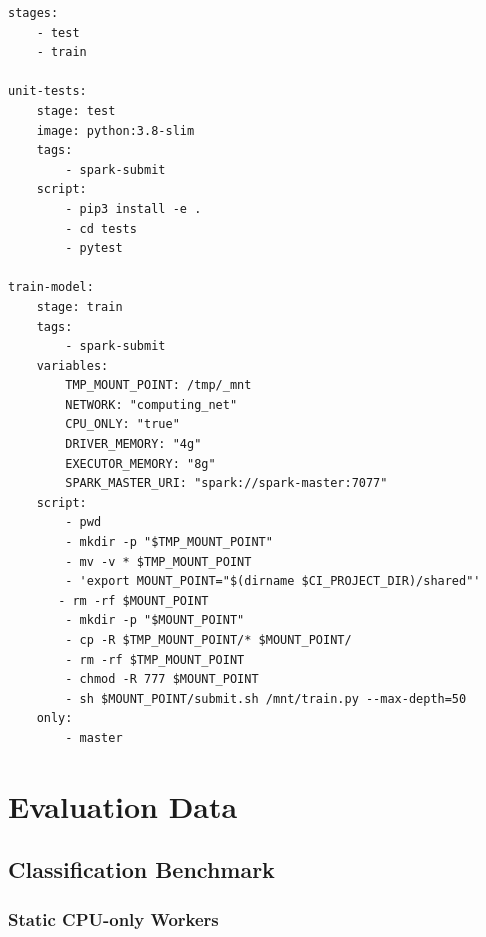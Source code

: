 \begin{lstlisting}[label=lst:appendix_ci-pipeline_job, caption=texttt{.gitlab-ci.yml} configuration file]
stages:
    - test
    - train
 
unit-tests:
    stage: test
    image: python:3.8-slim
    tags:
        - spark-submit
    script:
        - pip3 install -e .
        - cd tests
        - pytest
 
train-model:
    stage: train
    tags:
        - spark-submit
    variables:
        TMP_MOUNT_POINT: /tmp/_mnt
        NETWORK: "computing_net"
        CPU_ONLY: "true"
        DRIVER_MEMORY: "4g"
        EXECUTOR_MEMORY: "8g"
        SPARK_MASTER_URI: "spark://spark-master:7077"
    script:
        - pwd
        - mkdir -p "$TMP_MOUNT_POINT"
        - mv -v * $TMP_MOUNT_POINT
        - 'export MOUNT_POINT="$(dirname $CI_PROJECT_DIR)/shared"'
       - rm -rf $MOUNT_POINT
        - mkdir -p "$MOUNT_POINT"
        - cp -R $TMP_MOUNT_POINT/* $MOUNT_POINT/
        - rm -rf $TMP_MOUNT_POINT
        - chmod -R 777 $MOUNT_POINT
        - sh $MOUNT_POINT/submit.sh /mnt/train.py --max-depth=50
    only:
        - master
\end{lstlisting}


\section{Evaluation Data}
\label{sec:appendix_eval}

\subsection{Classification Benchmark}
\label{sec:appendix_eval_classification}

\subsubsection{Static CPU-only Workers}

